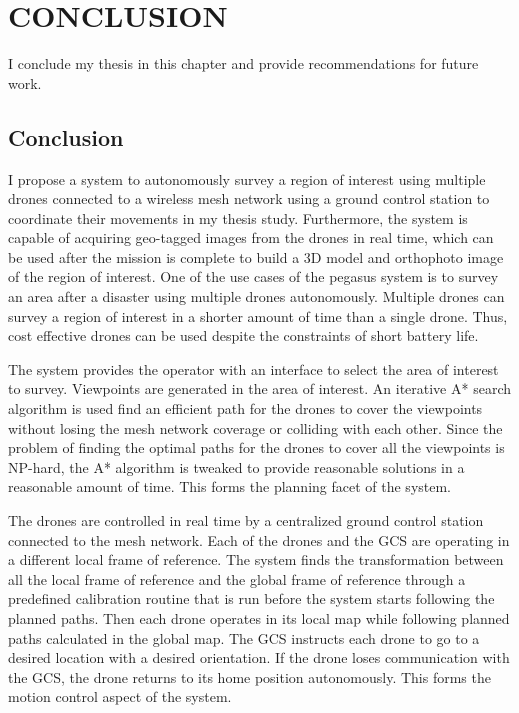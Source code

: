 \setlength{\parindent}{0.5in} 
\setlength{\parskip}{0mm}
\setlength{\baselineskip}{1.6em}

\chapter{CONCLUSION}
\label{ch:conclusion}

I conclude my thesis in this chapter and provide recommendations for future work.

\section{Conclusion}
I propose a system to autonomously survey a region of interest using multiple drones connected to a wireless mesh network using a ground control station to coordinate their movements in my thesis study. Furthermore, the system is capable of acquiring geo-tagged images from the drones in real time, which can be used after the mission is complete to build a 3D model and orthophoto image of the region of interest. One of the use cases of the pegasus system is to survey an area after a disaster using multiple drones autonomously. Multiple drones can survey a region of interest in a shorter amount of time than a single drone. Thus, cost effective drones can be used despite the constraints of short battery life.

The system provides the operator with an interface to select the area of interest to survey. Viewpoints are generated in the area of interest. An iterative A* search algorithm is used find an efficient path for the drones to cover the viewpoints without losing the mesh network coverage or colliding with each other. Since the problem of finding the optimal paths for the drones to cover all the viewpoints is NP-hard, the A* algorithm is tweaked to provide reasonable solutions in a reasonable amount of time. This forms the planning facet of the system.

The drones are controlled in real time by a centralized ground control station connected to the mesh network. Each of the drones and the GCS are operating in a different local frame of reference. The system finds the transformation between all the local frame of reference and the global frame of reference through a predefined calibration routine that is run before the system starts following the planned paths. Then each drone operates in its local map while following planned paths calculated in the global map. The GCS instructs each drone to go to a desired location with a desired orientation. If the drone loses communication with the GCS, the drone returns to its home position autonomously. This forms the motion control aspect of the system.

